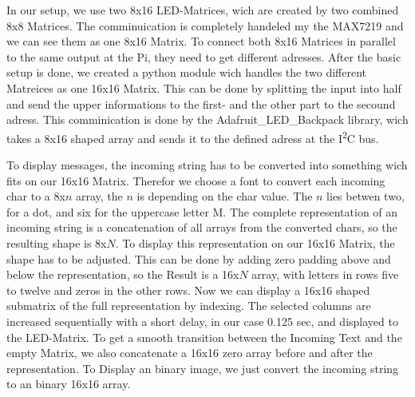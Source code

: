 \documentclass[conference]{IEEEtran}
\begin{document}
In our setup, we use two 8x16 LED-Matrices, wich are created by two combined 8x8 Matrices. The comminuication is completely handeled my the MAX7219 and we can see them as one 8x16 Matrix. To connect both 8x16 Matrices in parallel to the same output at the Pi, they need to get different adresses.
After the basic setup is done, we created a python module wich handles the two different Matreices as one 16x16 Matrix. This can be done by splitting the input into half and send the upper informations to the first- and the other part to the secound adress. This comminication is done by the Adafruit\_LED\_Backpack\cite{ledlibrary} library, wich takes a 8x16 shaped array and sends it to the defined adress at the I\textsuperscript{2}C bus.

To display messages, the incoming string has to be converted into something wich fits on our 16x16 Matrix. Therefor we choose a font to convert each incoming char to a 8x$n$ array, the $n$ is depending on the char value. The $n$ lies betwen two, for a dot, and six for the uppercase letter M. The complete representation of an incoming string is a concatenation of all arrays from the converted chars, so the resulting shape is 8x$N$. To display this representation on our 16x16 Matrix, the shape has to be adjusted. This can be done by adding zero padding above and below the representation, so the Result is a 16x$N$ array, with letters in rows five to twelve and zeros in the other rows. Now we can display a 16x16 shaped submatrix of the full representation by indexing. The selected columns are increased sequentially with a short delay, in our case 0.125 sec, and displayed to the LED-Matrix. To get a smooth transition between the Incoming Text and the empty Matrix, we also concatenate a 16x16 zero array before and after the representation.
To Display an binary image, we just convert the incoming string to an binary 16x16 array.
\end{document}

